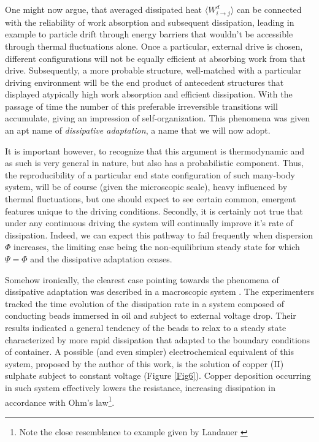 \documentclass[a4paper,12pt]{article}
\begin{document}
One might now argue, that averaged dissipated heat $\langle W^d_{i \to j} \rangle $ can be connected with the reliability of work absorption and subsequent dissipation, leading in example to particle drift through energy barriers that wouldn't be accessible through thermal fluctuations alone.
Once a particular, external drive is chosen, different configurations will not be equally efficient at absorbing work from that drive. Subsequently, a more probable structure, well-matched with a particular driving environment will be the end product of antecedent structures that displayed atypically high work absorption and efficient dissipation.
With the passage of time the number of this preferable irreversible transitions will accumulate, giving an impression of self-organization.
This phenomena was given an apt name of \textit{dissipative adaptation}, a name that we will now adopt.

It is important however, to recognize that this argument is thermodynamic and as such is very general in nature, but also has a probabilistic component.
Thus, the reproducibility of a particular end state configuration of such many-body system, will be of course (given the microscopic scale), heavy influenced by thermal fluctuations, but one should expect to see certain common, emergent features unique to the driving conditions.
Secondly, it is certainly not true that under any continuous driving the system will continually improve it's rate of dissipation. Indeed, we can expect this pathway to fail frequently when dispersion $\Phi$ increases, the limiting case being the non-equilibrium steady state for which $\Psi = \Phi$ and the dissipative adaptation ceases.


Somehow ironically, the clearest case pointing towards the phenomena of dissipative adaptation was described in a macroscopic system \cite{Kondepudi:2015bg}. The experimenters tracked the time evolution of the dissipation rate in a system composed of conducting beads immersed in oil and subject to external voltage drop. Their results indicated a general tendency of the beads to relax to a steady state characterized by more rapid dissipation that adapted to the boundary conditions of container.
A possible (and even simpler) electrochemical equivalent of this system, proposed by the author of this work, is the solution of copper (II) sulphate subject to constant voltage (Figure \ref{Fig6}). Copper deposition occurring in such system effectively lowers the resistance, increasing dissipation in accordance with Ohm's law\footnote{Note the close resemblance to example given by Landauer \cite{Landauer:pJ4RYJRG}}.
\end{document}
